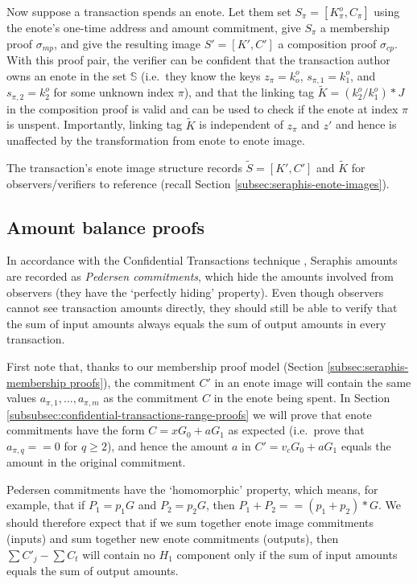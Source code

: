 Now suppose a transaction spends an enote. Let them set $S_{\pi} = [K^o_{\pi}, C_{\pi}]$ using the enote's one-time address and amount commitment, give $S_{\pi}$ a membership proof $\sigma_{mp}$, and give the resulting image $S' = [K', C']$ a composition proof $\sigma_{cp}$. With this proof pair, the verifier can be confident that the transaction author owns an enote in the set $\mathbb{S}$ (i.e.\ they know the keys $z_{\pi} = k^o_o$, $s_{\pi,1} = k^o_1$, and $s_{\pi,2} = k^o_2$ for some unknown index $\pi$), and that the linking tag $\tilde{K} = (k^o_2/k^o_1)*J$ in the composition proof is valid and can be used to check if the enote at index $\pi$ is unspent. Importantly, linking tag $\tilde{K}$ is independent of $z_{\pi}$ and $z'$ and hence is unaffected by the transformation from enote to enote image.

The transaction's enote image structure records $\tilde{S} = [K', C']$ and $\tilde{K}$ for observers/verifiers to reference (recall Section \ref{subsec:seraphis-enote-images}).


\subsection{Amount balance proofs}
\label{subsec:seraphis-amount-balance-proofs}

In accordance with the Confidential Transactions technique \cite{maxwell-ct-2}, Seraphis amounts are recorded as {\em Pedersen commitments}, which hide the amounts involved from observers (they have the `perfectly hiding' property). Even though observers cannot see transaction amounts directly, they should still be able to verify that the sum of input amounts always equals the sum of output amounts in every transaction.

First note that, thanks to our membership proof model (Section \ref{subsec:seraphis-membership proofs}), the commitment $C'$ in an enote image will contain the same values $a_{\pi,1},...,a_{\pi,m}$ as the commitment $C$ in the enote being spent. In Section \ref{subsubsec:confidential-transactions-range-proofs} we will prove that enote commitments have the form $C = x G_0 + a G_1$ as expected (i.e.\ prove that $a_{\pi,q} == 0$ for $q \geq 2$), and hence the amount $a$ in $C' = v_c G_0 + a G_1$ equals the amount in the original commitment.

Pedersen commitments have the `homomorphic' property, which means, for example, that if $P_1 = p_1 G$ and $P_2 = p_2 G$, then $P_1 + P_2 == (p_1 + p_2)*G$. We should therefore expect that if we sum together enote image commitments (inputs) and sum together new enote commitments (outputs), then $\sum C'_j - \sum C_t$ will contain no $H_1$ component only if the sum of input amounts equals the sum of output amounts.

